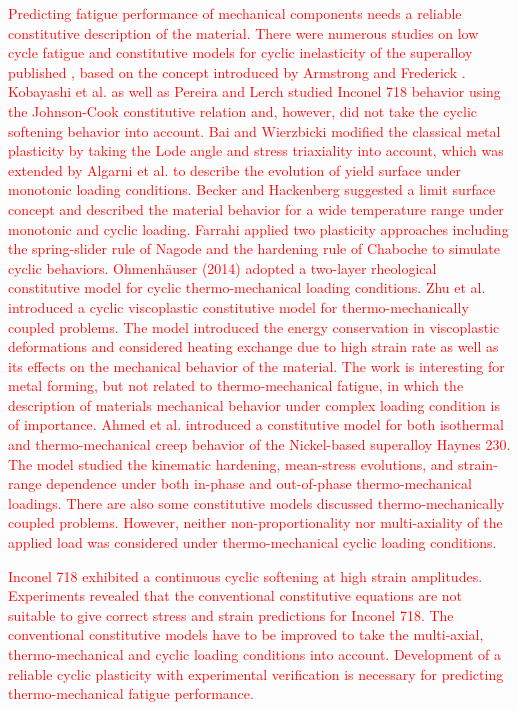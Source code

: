 \documentclass[preprint,5p,twocolumn,11pt,sort&compress]{elsarticle}
\newcommand{\marked}[1]{\textcolor{red}{#1}}
\begin{document}
\marked{Predicting fatigue performance of mechanical components needs a reliable constitutive description of the material. There were numerous studies on low cycle fatigue and constitutive models for cyclic inelasticity of the superalloy published \cite{ohno1993kinematic, Pun2014138, AbdelKarim2000225, Kang2004299}, based on the concept introduced by Armstrong and Frederick \cite{armstrong1966mathematical}. Kobayashi et al. \cite{Kobayashi2008389} as well as Pereira and Lerch \cite{Pereira2001715} studied Inconel 718 behavior using the Johnson-Cook constitutive relation and, however, did not take the cyclic softening behavior into account.
Bai and Wierzbicki \cite{Bai20081071} modified the classical metal plasticity by taking the Lode angle and stress triaxiality into account, which was extended by Algarni et al.  \cite{Algarni2015140} to describe the evolution of yield surface under monotonic loading conditions. Becker and Hackenberg \cite{Becker2011596} suggested a limit surface concept and described the material behavior for a wide temperature range under monotonic and cyclic loading.
Farrahi \cite{Farrahi2014245} applied two plasticity approaches including the spring-slider rule of Nagode and the hardening rule of Chaboche to simulate cyclic behaviors.
Ohmenh\"{a}user (2014) \cite{Ohmenhauser2014631} adopted a two-layer rheological constitutive model for cyclic thermo-mechanical loading conditions.
Zhu et al. \cite{ZHU2016} introduced a cyclic viscoplastic constitutive model for thermo-mechanically coupled problems. The model introduced the energy conservation in viscoplastic deformations and considered heating exchange due to high strain rate as well as its effects on the mechanical behavior of the material. The work is interesting for metal forming, but not related to thermo-mechanical fatigue, in which the description of materials mechanical behavior under complex loading condition is of importance. 
Ahmed et al. \cite{Ahmed2016,Ahmed2017} introduced a constitutive model for both isothermal and thermo-mechanical creep behavior of the Nickel-based superalloy Haynes 230. The model studied the kinematic hardening, mean-stress evolutions, and strain-range dependence under both in-phase and out-of-phase thermo-mechanical loadings.
There are also some constitutive models \cite{Mao2015,Nieto-Fuentes2018,Wang2017} discussed thermo-mechanically coupled problems.
However, neither non-proportionality nor multi-axiality of the applied load was considered under thermo-mechanical cyclic loading conditions.}

\marked{Inconel 718 exhibited a continuous cyclic softening at high strain amplitudes. Experiments revealed that the conventional constitutive equations are not suitable to give correct stress and strain predictions for Inconel 718. The conventional constitutive models have to be improved to take the multi-axial, thermo-mechanical and cyclic loading conditions into account.
Development of a reliable cyclic plasticity with experimental verification is necessary for predicting thermo-mechanical fatigue performance.}
\end{document}

